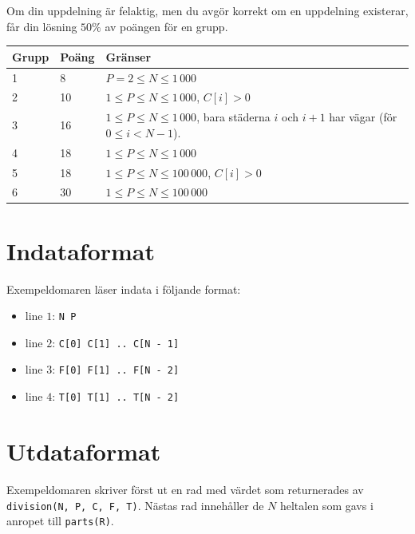 Om din uppdelning är felaktig, men du avgör korrekt om en uppdelning existerar, får din lösning $50\%$ av poängen för en grupp.

\begin{tabular}{|l|l|l|}
  \hline
  \textbf{Grupp} & \textbf{Poäng} & \textbf{Gränser} \\ \hline
  1 & 8 & $P = 2 \le N \le 1\,000$ \\ \hline
  2 & 10 & $1 \le P \le N \le 1\,000$, $C[i] > 0$ \\ \hline
  3 & 16 & $1 \le P \le N \le 1\,000$, bara städerna $i$ och $i + 1$ har vägar (för $0 \le i < N - 1$). \\ \hline
  4 & 18 & $1 \le P \le N \le 1\,000$ \\ \hline
  5 & 18 & $1 \le P \le N \le 100\,000$, $C[i] > 0$ \\ \hline
  6 & 30 & $1 \le P \le N \le 100\,000$ \\ \hline
\end{tabular}

\section*{Indataformat}
Exempeldomaren läser indata i följande format:

\begin{itemize}
  \item line $1$: \texttt{N P}
  \item line $2$: \texttt{C[0] C[1] .. C[N - 1]}
  \item line $3$: \texttt{F[0] F[1] .. F[N - 2]}
  \item line $4$: \texttt{T[0] T[1] .. T[N - 2]}
\end{itemize}

\section*{Utdataformat}
Exempeldomaren skriver först ut en rad med värdet som returnerades av \texttt{division(N, P, C, F, T)}.
Nästas rad innehåller de $N$ heltalen som gavs i anropet till \texttt{parts(R)}.

